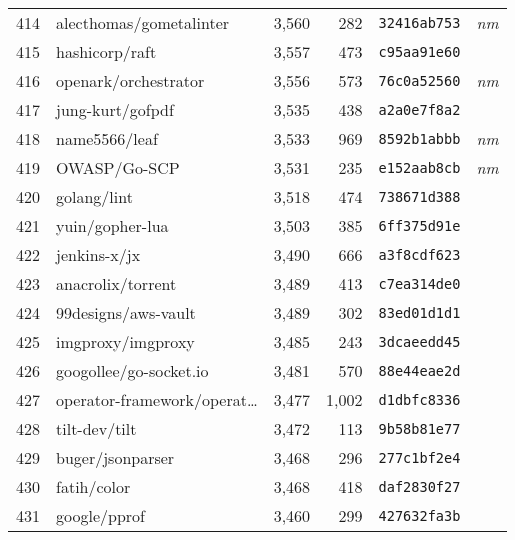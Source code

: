 {\begin{supertabular}{llrrll}
        414 &            alecthomas/gometalinter &  3,560 &    282 &  \texttt{32416ab753} &  \textit{nm} \\
        415 &                     hashicorp/raft &  3,557 &    473 &  \texttt{c95aa91e60} &              \\
        416 &               openark/orchestrator &  3,556 &    573 &  \texttt{76c0a52560} &  \textit{nm} \\
        417 &                   jung-kurt/gofpdf &  3,535 &    438 &  \texttt{a2a0e7f8a2} &              \\
        418 &                      name5566/leaf &  3,533 &    969 &  \texttt{8592b1abbb} &  \textit{nm} \\
        419 &                       OWASP/Go-SCP &  3,531 &    235 &  \texttt{e152aab8cb} &  \textit{nm} \\
        420 &                        golang/lint &  3,518 &    474 &  \texttt{738671d388} &              \\
        421 &                    yuin/gopher-lua &  3,503 &    385 &  \texttt{6ff375d91e} &              \\
        422 &                       jenkins-x/jx &  3,490 &    666 &  \texttt{a3f8cdf623} &              \\
        423 &                  anacrolix/torrent &  3,489 &    413 &  \texttt{c7ea314de0} &              \\
        424 &                99designs/aws-vault &  3,489 &    302 &  \texttt{83ed01d1d1} &              \\
        425 &                  imgproxy/imgproxy &  3,485 &    243 &  \texttt{3dcaeedd45} &              \\
        426 &             googollee/go-socket.io &  3,481 &    570 &  \texttt{88e44eae2d} &              \\
        427 &    operator-framework/operat\ldots &  3,477 &  1,002 &  \texttt{d1dbfc8336} &              \\
        428 &                      tilt-dev/tilt &  3,472 &    113 &  \texttt{9b58b81e77} &              \\
        429 &                   buger/jsonparser &  3,468 &    296 &  \texttt{277c1bf2e4} &              \\
        430 &                        fatih/color &  3,468 &    418 &  \texttt{daf2830f27} &              \\
        431 &                       google/pprof &  3,460 &    299 &  \texttt{427632fa3b} &              \\

\end{supertabular}}
